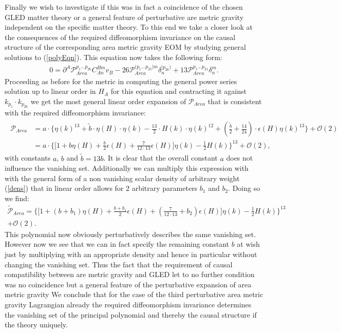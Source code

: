 \documentclass[a4paper,12pt, DIV=14, BCOR=5mm, twoside, headsepline]{scrbook}
\begin{document}
Finally we wish to investigate if this was in fact a coincidence of the chosen GLED matter theory or a general feature of perturbative are metric gravity independent on the specific matter theory. To this end we  take a closer look at the consequences of the required diffeomorphism invariance on the causal structure of the corresponding area metric gravity EOM by studying general solutions to (\ref{polyEqn}). This equation now takes the following form:
\begin{align}\label{AreaPolyEqn}
    0 = \partial^A \mathcal{P}_{Area}^{p_1...p_26} C_{An}^{Bm} v_B - 26\mathcal{P}_{Area}^{(p_1...p_{25}\vert m} \delta_n^{\vert p_{26})} + 13 \mathcal{P}_{Area}^{p_1...p_21} \delta^m_n.
\end{align}
Proceeding as before for the metric in computing the general power series solution up to linear order in $H_A$ for this equation and contracting it against $k_{p_1} \cdot k_{p_{26}}$ we get the most general linear order expansion of $\mathcal{P}_{Area}$ that is consistent with the required diffeomorphism invariance:
\begin{align}
\begin{aligned}
    \mathcal{P}_{Area} &= a \cdot \bigl \{  \eta(k)^{13} + \tilde{b} \cdot \eta(H) \cdot \eta(k) - \frac{13}{2} \cdot  H(k) \cdot \eta(k)^{12} + (\frac{\tilde{b}}{2}+\frac{14}{24}) \cdot \epsilon(H) \eta(k)^{13}  \bigr \} + \mathcal{O}(2)\\
    &=a \cdot \bigl\{  \bigl[ 1 + b \eta(H) + \frac{b}{2} \epsilon(H) +  \frac{7}{12\cdot13} \epsilon(H) \bigr] \eta(k) - \frac{1}{2} H(k)       \bigr\}^{13} + \mathcal{O}(2),
\end{aligned}
\end{align}
with constants $a$, $b$ and $\tilde{b} = 13b$. It is clear that the overall constant $a$ does not influence the vanishing set. Additionally we can multiply this expression with with the general form of a non vanishing scalar density of arbitrary weight (\ref{dens}) that in linear order allows for $2$ arbitrary parameters $b_1$ and $b_2$. Doing so we find:
\begin{multline}
    \tilde{\mathcal{P}}_{Area} = \bigl\{  \bigl[ 1 + (b+ b_1) \eta(H) + \frac{b+b_1}{2} \epsilon(H) +  (\frac{7}{12\cdot13}+b_2) \epsilon(H) \bigr] \eta(k) - \frac{1}{2} H(k)       \bigr\}^{13} \\
    + \mathcal{O}(2).
\end{multline}
This polynomial now obviously perturbatively describes the same vanishing set. However now we see that we can in fact specify the remaining constant $b$ at wish just by multiplying with an appropriate density and hence in particular without changing the vanishing set. 
Thus the fact that the requirement of causal compatibility between are metric gravity and GLED let to no further condition was no coincidence but a general feature of the perturbative expansion of area metric gravity
We conclude that for the case of the third perturbative area metric gravity Lagrangian already the required diffeomorphism invariance determines the vanishing set of the principal polynomial and thereby the causal structure if the theory uniquely. \\
\end{document}
